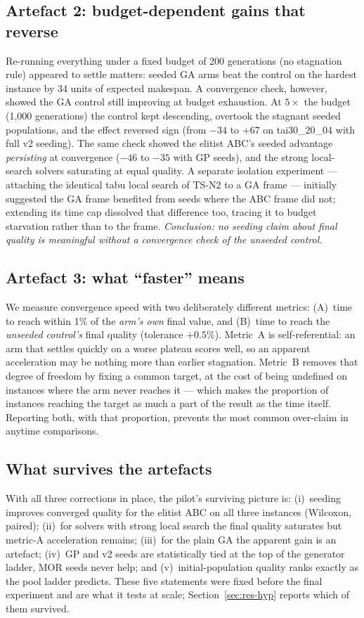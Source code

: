 \documentclass[review]{elsarticle}
\begin{document}
\subsection{Artefact 2: budget-dependent gains that reverse}
Re-running everything under a fixed budget of 200 generations (no
stagnation rule) appeared to settle matters: seeded GA arms beat the
control on the hardest instance by 34 units of expected makespan. A
convergence check, however, showed the GA control still improving at
budget exhaustion. At $5\times$ the budget (1{,}000 generations) the
control kept descending, overtook the stagnant seeded populations, and the
effect reversed sign (from $-34$ to $+67$ on tai30\_20\_04 with full v2
seeding). The same check showed the elitist ABC's seeded advantage
\emph{persisting} at convergence ($-46$ to $-35$ with GP seeds), and the
strong local-search solvers saturating at equal quality. A separate
isolation experiment --- attaching the identical tabu local search of
TS-N2 to a GA frame --- initially suggested the GA frame benefited from
seeds where the ABC frame did not; extending its time cap dissolved that
difference too, tracing it to budget starvation rather than to the frame.
\emph{Conclusion: no seeding claim about final quality is meaningful
without a convergence check of the unseeded control.}

\subsection{Artefact 3: what ``faster'' means}
We measure convergence speed with two deliberately different metrics:
(A)~time to reach within 1\% of the \emph{arm's own} final value, and
(B)~time to reach the \emph{unseeded control's} final quality (tolerance
$+0.5\%$). Metric~A is self-referential: an arm that settles quickly on a
worse plateau scores well, so an apparent acceleration may be nothing more
than earlier stagnation. Metric~B removes that degree of freedom by fixing
a common target, at the cost of being undefined on instances where the arm
never reaches it --- which makes the proportion of instances reaching the
target as much a part of the result as the time itself. Reporting both,
with that proportion, prevents the most common over-claim in anytime
comparisons.

\subsection{What survives the artefacts}
With all three corrections in place, the pilot's surviving picture is:
(i)~seeding improves converged quality for the elitist ABC on all three
instances (Wilcoxon, paired); (ii)~for solvers with strong local search
the final quality saturates but metric-A acceleration remains; (iii)~for
the plain GA the apparent gain is an artefact; (iv)~GP and v2 seeds are
statistically tied at the top of the generator ladder, MOR seeds never
help; and (v)~initial-population quality ranks exactly as the pool ladder
predicts. These five statements were fixed before the final experiment and
are what it tests at scale; Section~\ref{sec:res-hyp} reports which of them
survived.
\end{document}
